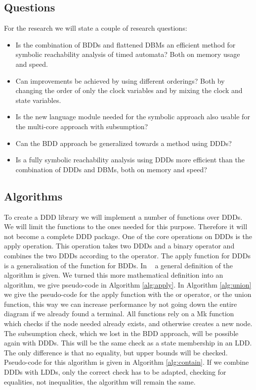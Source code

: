 \subsection{Questions}
For the research we will state a couple of research questions:
{\renewcommand\labelitemi{--}
	\begin{itemize}
		\item Is the combination of BDDs and flattened DBMs an efficient method for symbolic reachability analysis of timed automata? Both on memory usage and speed.
		\item Can improvements be achieved by using different orderings? Both by changing the order of only the clock variables and by mixing the clock and state variables.
		\item Is the new language module needed for the symbolic approach also usable for the multi-core approach with subsumption?
		\item Can the BDD approach be generalized towards a method using DDDs?
		\item Is a fully symbolic reachability analysis using DDDs more efficient than the combination of DDDs and DBMs, both on memory and speed?
	\end{itemize}
}

\subsection{Algorithms}
To create a DDD library we will implement a number of functions over DDDs. We will limit the functions to the ones needed for this purpose. Therefore it will not become a complete DDD package. One of the core operations on DDDs is the apply operation. This operation takes two DDDs and a binary operator and combines the two DDDs according to the operator. The apply function for DDDs is a generalisation of the function for BDDs. In ~\cite{ddds} a general definition of the algorithm is given. We turned this more mathematical definition into an algorithm, we give pseudo-code in Algorithm \ref{alg:apply}. In Algorithm \ref{alg:union} we give the pseudo-code for the apply function with the or operator, or the union function, this way we can increase performance by not going down the entire diagram if we already found a terminal. All functions rely on a Mk function which checks if the node needed already exists, and otherwise creates a new node.
The subsumption check, which we lost in the BDD approach, will be possible again with DDDs. This will be the same check as a state membership in an LDD. The only difference is that no equality, but upper bounds will be checked. Pseudo-code for this algorithm is given in Algorithm \ref{alg:contain}. If we combine DDDs with LDDs, only the correct check has to be adapted, checking for equalities, not inequalities, the algorithm will remain the same.

